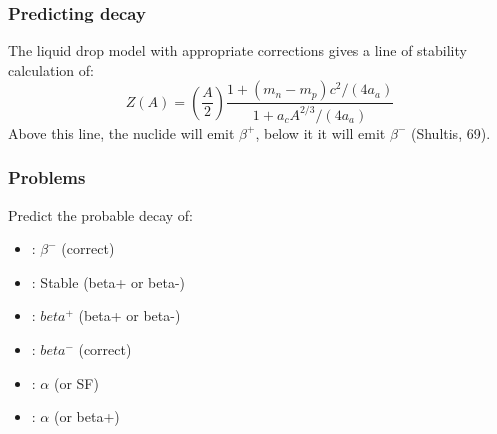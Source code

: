 \documentclass{article}
\begin{document}
\subsubsection{Predicting decay}
The liquid drop model with appropriate corrections gives a line of stability calculation of:
\begin{equation}
    Z(A) = \left( \frac{A}{2} \right) \frac{1+\left(m_n-m_p\right)c^2 / \left(4 a_a \right)}{1 + a_cA^{2/3} / \left(4 a_a \right)}
\end{equation}
Above this line, the nuclide will emit $\beta^+$, below it it will emit $\beta^-$ (Shultis, 69).

\subsubsection{Problems}
Predict the probable decay of:
\begin{itemize}
    \item {}: $\beta^-$ (correct)
    \item {}: Stable (beta+ or beta-)
    \item {}: $beta^+$ (beta+ or beta-)
    \item {}: $beta^-$ (correct)
    \item {}: $\alpha$ (or SF)
    \item {}: $\alpha$ (or beta+)
\end{itemize}
\end{document}
